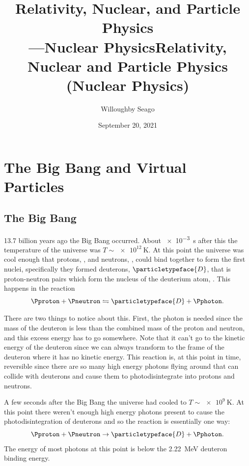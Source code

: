 \documentclass[fleqn]{NotesClass}
\title{Relativity, Nuclear, and Particle Physics\\{\Huge---Nuclear Physics}}
\author{Willoughby Seago}
\date{September 20, 2021}
\newcommand{\Pdeuteron}{\ensuremath{\particletypeface{D}}}
\begin{document}
    \frontmatter
    \titlepage
    \title{Relativity, Nuclear and Particle Physics (Nuclear Physics)}
    \tableofcontents
    \mainmatter
    
    \chapter{The Big Bang and Virtual Particles}
    \section{The Big Bang}
    13.7 billion years ago the Big Bang occurred.
    About \qty{e-3}{\second} after this the temperature of the universe was \(T \sim \qty{e12}{\kelvin}\).
    At this point the universe was cool enough that protons, \Pp, and neutrons, \Pn, could bind together to form the first nuclei, specifically they formed deuterons, \Pdeuteron, that is proton-neutron pairs which form the nucleus of the deuterium atom, .
    This happens in the reaction
    \begin{equation}
        \Pproton + \Pneutron \leftrightharpoons \Pdeuteron + \Pphoton.
    \end{equation}

    There are two things to notice about this.
    First, the photon is needed since the mass of the deuteron is less than the combined mass of the proton and neutron, and this excess energy has to go somewhere.
    Note that it can't go to the kinetic energy of the deuteron since we can always transform to the frame of the deuteron where it has no kinetic energy.
    This reaction is, at this point in time, reversible since there are so many high energy photons flying around that can collide with deuterons and cause them to photodisintegrate into protons and neutrons.
    
    A few seconds after the Big Bang the universe had cooled to \(T \sim \qty{e9}{\kelvin}\).
    At this point there weren't enough high energy photons present to cause the photodisintegration of deuterons and so the reaction is essentially one way:
    \begin{equation}
        \Pproton + \Pneutron \rightarrow \Pdeuteron + \Pphoton.
    \end{equation}
    The energy of most photons at this point is below the \qty{2.22}{\mega\electronvolt} deuteron binding energy.
    
\end{document}
